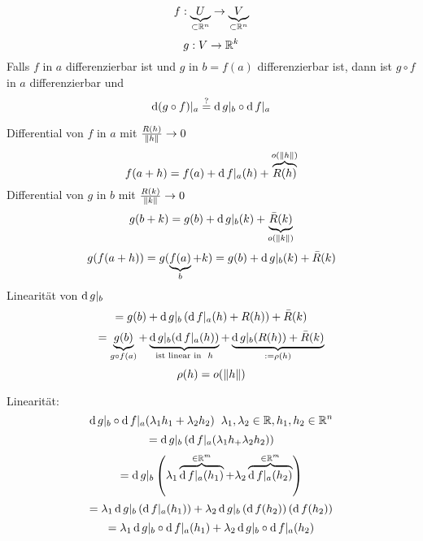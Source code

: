 \begin{Sat}
\[f:\underbrace{U}_{\subset \mathbb{R}^n}\rightarrow\underbrace{V}_{\subset \mathbb{R}^n}\]
\[g:V\rightarrow\mathbb{R}^k\]
  Falls $f$ in $a$ differenzierbar ist und $g$ in $b=f(a)$ differenzierbar ist, dann ist $g\circ f$ in $a$ differenzierbar und
  \begin{equation}
    \label{e:1104111}
    \operatorname{d}(g\circ f)|_{a}\stackrel{?}{=}\operatorname{d} g|_b\circ\operatorname{d} f|_a
  \end{equation}
\end{Sat}
\begin{Bew}
  Differential von $f$ in $a$ mit $\frac{R(h)}{\left\| h \right\|}\rightarrow 0$
  \[f(a+h)=f(a)+\operatorname{d} f|_a(h) +\overbrace{R(h)}^{o(\left\| h \right\|)}\]
  Differential von $g$ in $b$ mit $\frac{R(k)}{\left\| k \right\|}\rightarrow 0$
  \[g(b+k)=g(b)+\operatorname{d} g|_b(k) +\underbrace{\bar R(k)}_{o(\left\| k \right\|)}\]
  \[g(f(a+h))=g(\underbrace{f(a)}_b+k)=g(b)+\operatorname{d} g|_b (k)+\bar R(k)\]
  Linearität von $\operatorname{d} g|_b$
  \[=g(b)+\operatorname{d} g|_b\left( \operatorname{d} f|_a(h)+R(h) \right)+\bar R(k)\]
  \[=\underbrace{g(b)}_{g\circ f(a)}+\underbrace{\operatorname{d} g|_b(\operatorname{d} f|_a(h))}_{\text{ist linear in}\hspace{2mm} h}+\underbrace{\operatorname{d} g|_b(R(h))+\bar R(k)}_{:=\rho(h)}\]
  \[\rho(h)=o(\left\| h \right\|)\]
\end{Bew}
\begin{Lem}
  Linearität:
  \[\operatorname{d} g|_b\circ\operatorname{d} f|_a(\lambda_1h_1+\lambda_2h_2)\hspace{2mm}\lambda_1,\lambda_2\in\mathbb{R}, h_1,h_2\in\mathbb{R}^n\]
  \[=\operatorname{d} g|_b\left( \operatorname{d} f|_a(\lambda_1h_+\lambda_2h_2 \right))\]
  \[=\operatorname{d} g|_b\left( \lambda_1\overbrace{\operatorname{d} f|_a(h_1)}^{\in\mathbb{R}^m}+\lambda_2\overbrace{\operatorname{d} f|_a(h_2)}^{\in\mathbb{R}^m} \right)\]
  \[=\lambda_1\operatorname{d} g|_b\left( \operatorname{d} f|_a(h_1) \right)+\lambda_2\operatorname{d} g|_b\left( \operatorname{d} f(h_2) \right)\left( \operatorname{d} f(h_2) \right)\]
  \[=\lambda_1\operatorname{d} g|_b\circ \operatorname{d} f|_a(h_1)+\lambda_2\operatorname{d} g|_b\circ \operatorname{d} f|_a(h_2)\]
\end{Lem}
